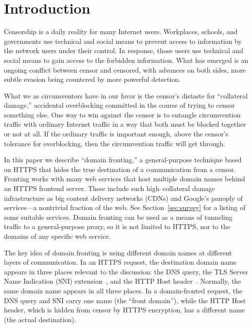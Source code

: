 \documentclass[conference]{IEEEtran}
\begin{document}
\section{Introduction}


Censorship is a daily reality for many Internet users.
Workplaces, schools, and governments use technical and social means
to prevent access to information by the network users under their control.
In response, those users use technical and social means
to gain access to the forbidden information.
What has emerged is an ongoing conflict between censor and censored,
with advances on both sides, more subtle evasion being countered by more powerful detection.

What we as circumventors have in our favor is the censor's
distaste for ``collateral damage,''
accidental overblocking committed in the course of trying to censor something else.
One way to win against the censor is to entangle circumvention traffic
with ordinary Internet traffic in a way that both must be blocked together
or not at all.
If the ordinary traffic is important enough,
above the censor's tolerance for overblocking,
then the circumvention traffic will get through.

In this paper we describe ``domain fronting,'' a general-purpose technique
based on HTTPS that hides the true destination of a communication
from a censor.
Fronting works with many web services that host multiple domain names
behind an HTTPS frontend server.
These include such high--collateral damage infrastructure as
big content delivery networks (CDNs)
and Google's panoply of services---a nontrivial fraction of the web.
See Section~\ref{sec:survey} for a listing of some suitable services.
Domain fronting can be used as a means of tunneling traffic
to a general-purpose proxy,
so it is not limited to HTTPS, nor to the domains of any specific web service.

The key idea of domain fronting is using
different domain names at different layers of communication.
In an HTTPS request, the destination domain name appears
in three places relevant to the discussion:
the DNS query,
the TLS Server Name Indication (SNI) extension~\cite[Section~3]{rfc6066},
and the HTTP Host header~\cite[Section~14.23]{rfc2616}.
Normally, the same domain name appears in all three places.
In a domain-fronted request,
the DNS query and SNI carry one name (the ``front domain''),
while the HTTP Host header,
which is hidden from censor by HTTPS encryption,
has a different name (the actual destination).
\end{document}
